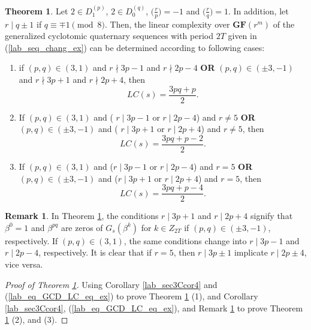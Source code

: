 \documentclass{mcom-l}
\theoremstyle{definition}
\newtheorem{sec3Cremark4}[sec3_remark1]{Remark}
\newtheorem{sec3CThm04}[sec3thm1]{Theorem}
\numberwithin{equation}{section}
\begin{document}
    \begin{sec3CThm04}\label{lab_sec3CThm04}
    Let $ 2\in D_{1}^{(p)} $, $ 2\in D_{0}^{(q)} $, $ \bigl(\tfrac{r}{p}\bigr) =-1$ and $ \bigl(\tfrac{r}{q}\bigr) =1$. In addition, let $ r\mid q\pm 1 $ if $ q\equiv\mp 1\pmod 8 $. Then, the linear complexity over $ \mathbf{GF}(r^{m}) $ of the generalized cyclotomic quaternary sequences with period $ 2T $ given in (\ref{lab_seq_chang_ex}) can be determined according to following cases: 
    \begin{enumerate}
     \item if $ (p,q)\in (3,1) $ and $ r\nmid 3p-1 $ and $ r\nmid 2p-4 $ \textbf{OR} $ (p,q)\in (\pm 3,-1) $  and $ r\nmid 3p+1 $ and $ r\nmid 2p+4 $, then 
           \begin{equation*}
           LC(s)=\frac{3pq+p}{2}.
           \end{equation*}
    \item If $ (p,q)\in (3,1) $ and ( $ r\mid 3p-1 $ or $ r\mid 2p-4 $) and $ r\ne 5 $ \textbf{OR} $ (p,q)\in (\pm 3,-1) $ and ( $ r\mid 3p+1 $ or $ r\mid 2p+4 $) and $ r\ne 5 $, then
             \begin{equation*}
                LC(s)=\frac{3pq+p-2}{2}.
                \end{equation*}
    \item If $ (p,q)\in (3,1) $  and ($ r\mid 3p-1 $ or $ r\mid 2p-4 $) and $ r=5 $ \textbf{OR } $ (p,q)\in (\pm 3,-1) $  and ($ r\mid 3p+1 $ or $ r\mid 2p+4 $) and $ r=5 $, then
                  \begin{equation*}
                  LC(s)=\frac{3pq+p-4}{2}.
                  \end{equation*}
            \end{enumerate}
    \end{sec3CThm04}
    \begin{sec3Cremark4}\label{Lab_sec3Cremark4}
    In Theorem \ref{lab_sec3CThm04}, the conditions $ r\mid 3p+1 $ and $ r\mid 2p+4 $ signify that  $ \beta^{0}=1 $ and $ \beta^{pq} $ are zeros of  $ G_{s}(\beta^{k}) $ for $ k\in Z_{2T} $ if $ (p,q)\in (\pm 3,-1) $, respectively. If $ (p,q)\in (3,1) $, the same conditions change into $ r\mid 3p-1 $ and $ r\mid 2p-4$, respectively. It is clear that if $ r=5 $, then $ r\mid 3p\pm 1 $ implicate $ r\mid 2p\pm 4 $, vice versa.
    \end{sec3Cremark4}
    \begin{proof}[Proof of Theorem \ref{lab_sec3CThm04}]
    Using Corollary \ref{lab_sec3Ccor4} and (\ref{lab_eq_GCD_LC_eq_ex}) to prove Theorem \ref{lab_sec3CThm04} (1), and  Corollary \ref{lab_sec3Ccor4}, (\ref{lab_eq_GCD_LC_eq_ex}), and Remark \ref{Lab_sec3Cremark4} to prove Theorem \ref{lab_sec3CThm04} (2), and (3).
    \end{proof}
    
\end{document}
